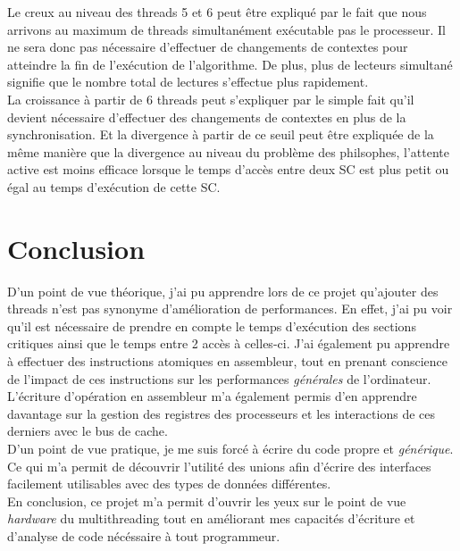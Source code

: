 \noindent Le creux au niveau des threads 5 et 6 peut être expliqué par le fait que nous arrivons au maximum de threads simultanément exécutable pas le processeur. Il ne sera donc pas nécessaire d'effectuer de changements de contextes pour atteindre la fin de l'exécution de l'algorithme. De plus, plus de lecteurs simultané signifie que le nombre total de lectures s'effectue plus rapidement.\\

\noindent La croissance à partir de 6 threads peut s'expliquer par le simple fait qu'il devient nécessaire d'effectuer des changements de contextes en plus de la synchronisation. Et la divergence à partir de ce seuil peut être expliquée de la même manière que la divergence au niveau du problème des philsophes, l'attente active est moins efficace lorsque le temps d'accès entre deux SC est plus petit ou égal au temps d'exécution de cette SC.

\section{Conclusion}

D'un point de vue théorique, j'ai pu apprendre lors de ce projet qu'ajouter des threads n'est pas synonyme d'amélioration de performances.
En effet, j'ai pu voir qu'il est nécessaire de prendre en compte le temps d'exécution des sections critiques ainsi que le temps entre 2 accès à celles-ci. 
J'ai également pu apprendre à effectuer des instructions atomiques en assembleur, tout en prenant conscience de l'impact de ces instructions sur les performances \textit{générales} de l'ordinateur. 
L'écriture d'opération en assembleur m'a également permis d'en apprendre davantage sur la gestion des registres des processeurs et les interactions de ces derniers avec le bus de cache. \\

\noindent D'un point de vue pratique, je me suis forcé à écrire du code propre et \textit{générique}. Ce qui m'a permit de découvrir l'utilité des unions afin d'écrire des interfaces facilement utilisables avec des types de données différentes. \\

\noindent En conclusion, ce projet m'a permit d'ouvrir les yeux sur le point de vue \textit{hardware} du multithreading tout en améliorant mes capacités d'écriture et d'analyse de code nécéssaire à tout programmeur.




